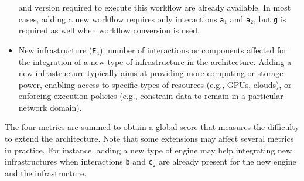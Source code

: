 \documentclass[preprint,3p,twocolumn]{elsarticle}
\newcommand{\todo}[2]{\pdfmargincomment[color=red,author=#1,open=true]{#2}}
\begin{document}
\begin{itemize}[leftmargin=0cm,itemindent=0.35cm,itemsep=0cm]
  and version required to execute this workflow are already
  available. In most cases, adding a new workflow requires only
  interactions \texttt{a$_1$} and \texttt{a$_2$}, but \texttt{g}
  is required as well when workflow conversion is used. 
\item New infrastructure (\texttt{E$_4$}): number of interactions or
  components affected for the integration of a new type of infrastructure in
  the architecture. Adding a new infrastructure typically aims at providing more
  computing or storage power, enabling access to specific types of resources
  (e.g., GPUs, clouds), or  enforcing execution policies (e.g.,
  constrain data to remain in a particular network domain).
\end{itemize}
The four metrics are summed to obtain a global score that measures the
difficulty to extend the architecture. Note that some extensions may
affect several metrics in practice. For instance, adding a new type
of engine may help integrating new infrastructures when interactions
\texttt{b} and \texttt{c$_2$} are already present for the new engine
and the infrastructure.
\end{document}
